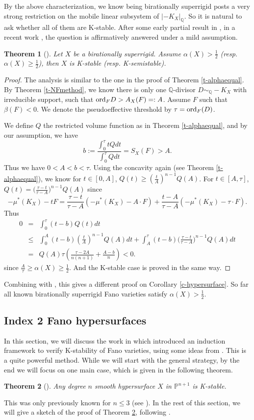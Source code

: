 \documentclass[12pt,reqno]{amsart}%
\newcommand{\ord}{{\rm ord}}
\newtheorem{thm}{Theorem}[section]
\theoremstyle{definition}
\theoremstyle{remark}
\newcommand{\bQ}{{\mathbb{Q}}}
\begin{document}
By the above characterization, we know being birationally superrigid posts a very strong restriction on the mobile linear subsystem of $|-K_X|_{\mathbb{Q}}$. So it is natural to ask whether all of them are K-stable. After some early partial result in \cite{OO13}, in a recent work \cite{SZ19}, the question is affirmatively answered under a mild assumption. 
\begin{thm}[\cite{SZ19}]Let $X$ be a birationally superrigid. Assume $\alpha(X)>\frac{1}{2}$ (resp. $\alpha(X)\ge \frac{1}{2}$), then $X$ is K-stable (resp. K-semistable). 
\end{thm}
\begin{proof}The analysis is similar to the one in the proof of Theorem \ref{t-alphaequal}. By Theorem \ref{t-NFmethod}, we know there is only one $\bQ$-divisor $D\sim_{\mathbb{Q}}-K_X$ with irreducible support, such that $\ord_{F}D>A_{X}(F)=:A$. 
Assume $F$ such that $\beta(F)<0$. We denote the pseudoeffective threshold by $\tau=\ord_{F}(D)$.

We define $Q$ the restricted volume function as in Theorem \ref{t-alphaequal}, and by our assumption, we have
$$b:= \frac{\int^{\tau}_0 tQdt}{\int^{\tau}_0Q dt}={S_X(F)}>A.$$
Thus we have $0< A< b < \tau$. 
Using the concavity again (see Theorem \ref{t-alphaequal}), we know for $t\in [0,A]$, $Q(t)\ge (\frac{t}{A})^{n-1}Q(A)$. For $t\in [A,\tau]$,  $Q(t)=\big(\frac{\tau-t}{\tau-A}\big)^{n-1}Q(A)$
since 
$$-\mu^*(K_X)-tF=\frac{\tau-t}{\tau-A}(-\mu^*(K_X)-A\cdot F)+\frac{t-A}{\tau-A}(-\mu^*(K_X)-\tau\cdot F).$$
Thus 
\begin{eqnarray*}
  0&=&\int^{\tau}_{0}(t-b)Q(t)dt\\
  &\le & \int^{A}_{0}(t-b) (\frac{t}{A})^{n-1}Q(A)dt+\int^{\tau}_{A}(t-b)\big(\frac{\tau-t}{\tau-A}\big)^{n-1}Q(A)dt\\
  &=& Q(A)\tau(\frac{\tau-2A}{n(n+1)}+\frac{A-b}{n} )<0.
\end{eqnarray*}
since  $\frac{A}{\tau}\ge \alpha(X)\ge \frac{1}{2}$. And the K-stable case is proved in the same way. 
\end{proof}

Combining with \cite{deF16}, this gives a different proof on Corollary \ref{c-hypersurface}. So far all known birationally superrigid Fano varieties satisfy $\alpha(X)>\frac{1}{2}$.


\subsection{Index 2 Fano hypersurfaces}
In this section, we will discuss the work in \cite{AZ20} which introduced an induction framework to verify K-stability of Fano varieties, using some ideas from \cite{Zhu20a}. This is a quite  powerful method. While we will start with the general strategy,  by the end we will focus on one main case, which is given in the following theorem. 
\begin{thm}[{\cite{AZ20}}]\label{t-index2}
Any degree $n$ smooth hypersurface $X$ in $\mathbb{P}^{n+1}$ is K-stable.
\end{thm}
This was only previously known for $n\le 3$ (see \cite{Tia90, LX19}). In the rest of this section, we will give a sketch of the proof of Theorem \ref{t-index2}, following \cite{AZ20}.
\end{document}
